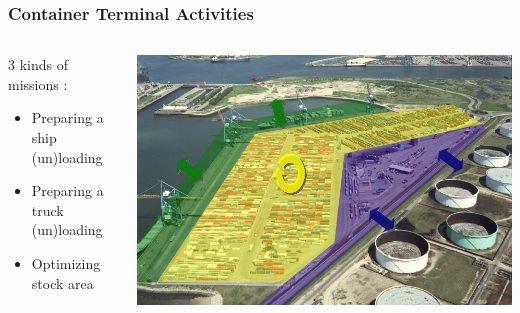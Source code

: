 \documentclass{beamer}
\begin{document}
\begin{frame}
\frametitle{Container Terminal Activities}
\begin{columns}
  \begin{column}[l]{5.5cm}
	3 kinds of missions : 
	 \begin{itemize}
	  \item Preparing a \textcolor{vert}{ship} (un)loading
	  \item Preparing a \textcolor{bleu}{truck} (un)loading
	  \item Optimizing \textcolor{jaune}{stock} area
	\end{itemize}
\end{column}
  \begin{column}[r]{5.5cm}
	\begin{flushright}
	    \includegraphics[height=.5\textheight]{fig/threeKindsOfMissions.png}
	\end{flushright}
  \end{column}
\end{columns}
\end{frame}
\end{document}
